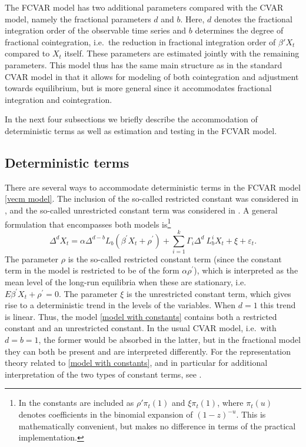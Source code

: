\documentclass[article]{jss}
\begin{document}
The FCVAR model has two additional parameters compared with the CVAR model, namely the fractional parameters $d$ and $b$. Here, $d$ denotes the fractional integration order of the observable time series and $b$ determines the degree of fractional cointegration, i.e.\ the reduction in fractional integration order of $\beta'X_t$ compared to $X_t$ itself. These parameters are estimated jointly with the remaining parameters. This model thus has the same main structure as in the standard CVAR model in that it allows for modeling of both cointegration and adjustment towards equilibrium, but is more general since it accommodates fractional integration and cointegration.

In the next four subsections we briefly describe the accommodation of deterministic terms as well as estimation and testing in the FCVAR model.

\subsection{Deterministic terms}

There are several ways to accommodate deterministic terms in the FCVAR model \eqref{vecm model}. The inclusion of the so-called restricted constant was considered in \cite{johansen2012likelihood}, and the so-called unrestricted constant term was considered in \cite{Dolatabadi2014}. A general formulation that encompasses both models is\footnote{In \cite{Dolatabadi2014} the constants are included as $\rho' \pi_t(1)$ and $\xi \pi_t(1)$, where $\pi_t(u)$ denotes coefficients in the binomial expansion of $(1-z)^{-u}$. This is mathematically convenient, but makes no difference in terms of the practical implementation.}
\begin{equation}
\Delta^{d}X_{t}= \alpha \Delta^{d-b} L_{b} (\beta^{\prime} X_{t} +\rho^{\prime}) + 
\sum_{i=1}^{k}\Gamma_{i}\Delta^{d}\ L_{b}^{i}X_{t} +\xi
+ \varepsilon_{t}.
\label{model with constants}
\end{equation}
The parameter $\rho $ is the so-called restricted constant term (since the constant term in the model is restricted to be of the form $\alpha \rho ^{\prime }$), which is interpreted as the mean level of the long-run equilibria when these are stationary, i.e.\ $E\beta ^{\prime }X_{t}+\rho ^{\prime }=0$. The parameter $\xi$ is the unrestricted constant term, which gives rise to a deterministic trend in the levels of the variables. When $d=1$ this trend is linear. Thus, the model \eqref{model with constants} contains both a restricted constant and an unrestricted constant. In the usual CVAR model, i.e.\ with $d=b=1$, the former would be absorbed in the latter, but in the fractional model they can both be present and are interpreted differently. For the representation theory related to \eqref{model with constants}, and in particular for additional interpretation of the two types of constant terms, see \cite{Dolatabadi2014}.
\end{document}
